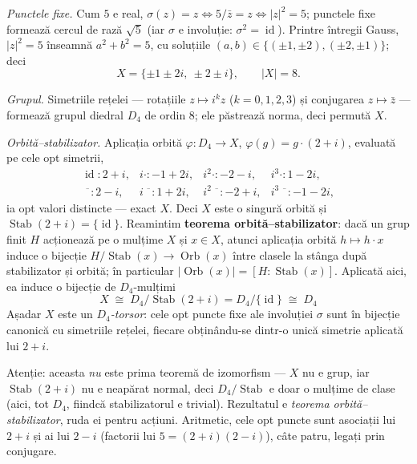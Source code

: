 \begin{solutie}
\textit{Punctele fixe.} Cum $5$ e real, $\sigma(z)=z\iff 5/\bar z=z\iff
|z|^{2}=5$; punctele fixe formează cercul de rază $\sqrt5$ (iar
$\sigma$ e involuție: $\sigma^{2}=\operatorname{id}$). Printre întregii
Gauss, $|z|^{2}=5$ înseamnă $a^{2}+b^{2}=5$, cu soluțiile
$(a,b)\in\{(\pm1,\pm2),(\pm2,\pm1)\}$; deci
\[
  X=\{\pm1\pm2i,\ \pm2\pm i\},\qquad |X|=8 .
\]

\textit{Grupul.} Simetriile rețelei --- rotațiile $z\mapsto i^{k}z$
($k=0,1,2,3$) și conjugarea $z\mapsto\bar z$ --- formează grupul
diedral $D_{4}$ de ordin $8$; ele păstrează norma, deci permută
$X$.

\textit{Orbită--stabilizator.} Aplicația orbită
$\varphi:D_{4}\to X$, $\varphi(g)=g\cdot(2+i)$, evaluată pe cele opt
simetrii,
\[
\begin{array}{llll}
  \operatorname{id}:2+i, & i\cdot:-1+2i, & i^{2}\cdot:-2-i, & i^{3}\cdot:1-2i,\\[2pt]
  \ \overline{\phantom{x}}:2-i, & i\,\overline{\phantom{x}}:1+2i,
  & i^{2}\,\overline{\phantom{x}}:-2+i, & i^{3}\,\overline{\phantom{x}}:-1-2i,
\end{array}
\]
ia opt valori distincte --- exact $X$. Deci $X$ este o singură orbită
și $\operatorname{Stab}(2+i)=\{\operatorname{id}\}$. Reamintim
\textbf{teorema orbită--stabilizator}: dacă un grup finit $H$
acționează pe o mulțime $X$ și $x\in X$, atunci aplicația
orbită $h\mapsto h\cdot x$ induce o bijecție
$H/\!\operatorname{Stab}(x)\to\operatorname{Orb}(x)$ între clasele la
stânga după stabilizator și orbită; în particular
$|\!\operatorname{Orb}(x)|=[H:\operatorname{Stab}(x)]$. Aplicată aici,
ea induce o bijecție de $D_{4}$-mulțimi
\[
  \boxed{\;X\;\cong\;D_{4}/\!\operatorname{Stab}(2+i)=D_{4}/\{\operatorname{id}\}\;\cong\;D_{4}\;}
\]
Așadar $X$ este un \emph{$D_{4}$-torsor}: cele opt puncte fixe ale
involuției $\sigma$ sunt în bijecție canonică cu simetriile
rețelei, fiecare obținându-se dintr-o unică simetrie
aplicată lui $2+i$.
\end{solutie}

\begin{obs}
Atenție: aceasta \emph{nu} este prima teoremă de izomorfism --- $X$
nu e grup, iar $\operatorname{Stab}(2+i)$ nu e neapărat normal, deci
$D_{4}/\!\operatorname{Stab}$ e doar o mulțime de clase (aici, tot
$D_{4}$, fiindcă stabilizatorul e trivial). Rezultatul e \emph{teorema
orbită--stabilizator}, ruda ei pentru acțiuni. Aritmetic, cele opt
puncte sunt asociații lui $2+i$ și ai lui $2-i$ (factorii lui
$5=(2+i)(2-i)$), câte patru, legați prin conjugare.
\end{obs}

